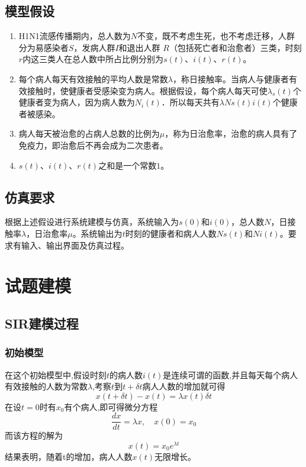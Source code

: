 \documentclass[supercite]{HustGraduPaper}
\begin{document}
	\subsection{模型假设}
	\begin{enumerate}
		\item H1N1流感传播期内，总人数为$N$不变，既不考虑生死，也不考虑迁移，人群分为易感染者$S$，发病人群$I$和退出人群 $R$（包括死亡者和治愈者）三类，时刻$r$内这三类人在总人数中所占比例分别为$s(t)$、$i(t)$、$r(t)$。
		\item 每个病人每天有效接触的平均人数是常数$\lambda$，称日接触率。当病人与健康者有效接触时，使健康者受感染变为病人。根据假设，每个病人每天可使$\lambda_s(t)$个健康者变为病人，因为病人数为$N_i(t)$．所以每天共有$\lambda N s(t) i(t)$个健康者被感染。
		\item 病人每天被治愈的占病人总数的比例为$\mu$，称为日治愈率，治愈的病人具有了免疫力，即治愈后不再会成为二次患者。
		\item $s(t)$、$i(t)$、$r(t)$之和是一个常数$1$。
	\end{enumerate}

	\subsection{仿真要求}
		根据上述假设进行系统建模与仿真，系统输入为$s(0)$和$i(0)$，总人数$N$，日接触率$\lambda$，日治愈率$\mu$。系统输出为$t$时刻的健康者和病人人数$Ns(t)$和$Ni(t)$。要求有输入、输出界面及仿真过程。

	\section{试题建模}
	\subsection{SIR建模过程}
	\subsubsection{初始模型}
	在这个初始模型中,假设时刻$t$的病人数$i(t)$是连续可谓的函数,并且每天每个病人有效接触的人数为常数$\lambda$,考察$t$到$t+\delta t$病人人数的增加就可得
	$$x(t+\delta t)-x(t) = \lambda x(t) \delta t$$
	在设$t = 0$时有$x_0$有个病人,即可得微分方程
	$$\frac{dx}{dt} = \lambda x, \quad x(0)=x_0$$
	而该方程的解为
	$$x(t)=x_0e^{\lambda t}$$
	结果表明，随着t的增加，病人人数$x(t)$无限增长。
\end{document}
